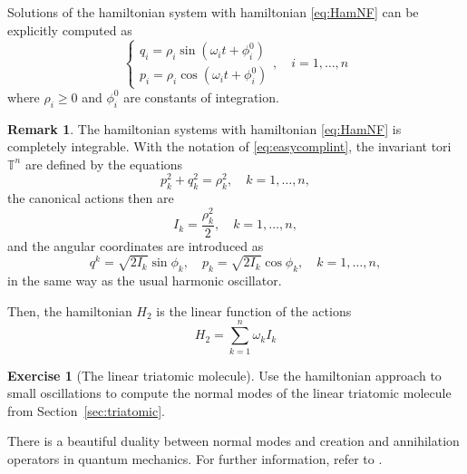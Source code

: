 \documentclass[english,fontsize=11pt,paper=b5]{scrbook}
\theoremstyle{definition}
\newtheorem{remark}{Remark}[chapter]
\newtheorem{exercise}{Exercise}[chapter]
\begin{document}
      Solutions of the hamiltonian system with hamiltonian \eqref{eq:HamNF} can be explicitly computed as
      \begin{equation}\label{eq:easycomplint}
        \left\lbrace
          \begin{aligned}
            q_i = \rho_i \sin(\omega_it +\phi_i^0) \\
            p_i = \rho_i \cos(\omega_it +\phi_i^0)
          \end{aligned}
        \right .,\quad i=1,\ldots,n
      \end{equation}
      where $\rho_i\geq0$ and $\phi_i^0$ are constants of integration.

      \begin{remark}
        The hamiltonian systems with hamiltonian \eqref{eq:HamNF} is completely integrable.
        With the notation of \eqref{eq:easycomplint}, the invariant tori $\mathbb{T}^n$ are defined by the equations
        \begin{equation}
          p_k^2 + q_k^2 = \rho_k^2, \quad k=1,\ldots,n,
        \end{equation}
        the canonical actions then are
        \begin{equation}
          I_k = \frac{\rho_k^2}2, \quad k=1,\ldots,n,
        \end{equation}
        and the angular coordinates are introduced as
        \begin{equation}
          q^k = \sqrt{2I_k} \sin \phi_k, \quad p_k = \sqrt{2I_k} \cos \phi_k, \quad k=1,\ldots,n,
        \end{equation}
        in the same way as the usual harmonic oscillator.

        Then, the hamiltonian $H_2$ is the linear function of the actions
        \begin{equation}
          H_2 = \sum_{k=1}^n \omega_k I_k
        \end{equation}
      \end{remark}

      \begin{exercise}[The linear triatomic molecule]
        Use the hamiltonian approach to small oscillations to compute the normal modes of the linear triatomic molecule from Section~\ref{sec:triatomic}.
      \end{exercise}

      There is a beautiful duality between normal modes and creation and annihilation operators in quantum mechanics. For further information, refer to \cite[Chapter 2.10]{book:lowenstein}.
\end{document}
